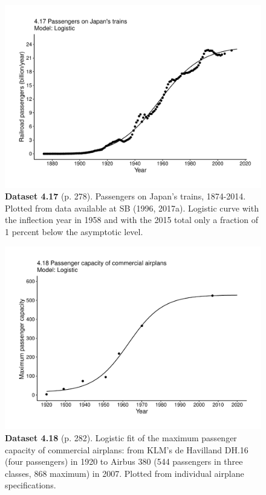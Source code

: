 \documentclass[aps,rmp,preprint,superscriptaddress,10pt,onecolumn]{article}
\begin{document}
\clearpage
\begin{figure}[h]
\includegraphics[width=\textwidth]{output/figs-ggplot/4.17.pdf}
\caption*{\textbf{Dataset 4.17} (p. 278). Passengers on Japan's trains, 1874-2014. Plotted from data available at SB (1996, 2017a). Logistic curve with the inflection year in 1958 and with the 2015 total only a fraction of 1 percent below the asymptotic level.}
\end{figure}
	
\clearpage
\begin{figure}[h]
\includegraphics[width=\textwidth]{output/figs-ggplot/4.18.pdf}
\caption*{\textbf{Dataset 4.18} (p. 282). Logistic fit of the maximum passenger capacity of commercial airplans: from KLM's de Havilland DH.16 (four passengers) in 1920 to Airbus 380 (544 passengers in three classes, 868 maximum) in 2007. Plotted from individual airplane specifications.}
\end{figure}
	
\end{document}
